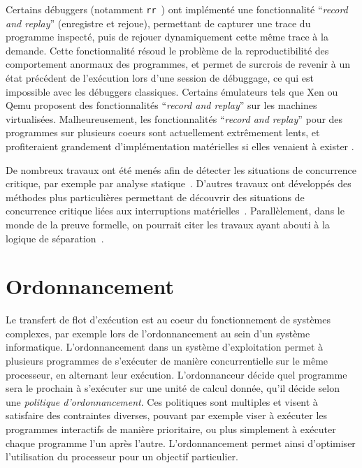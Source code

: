 Certains débuggers (notamment \texttt{rr}~\cite{mozRR}) ont implémenté une fonctionnalité ``\emph{record and replay}'' (enregistre et rejoue), permettant de capturer une trace du programme inspecté, puis de rejouer dynamiquement cette même trace à la demande. Cette fonctionnalité résoud le problème de la reproductibilité des comportement anormaux des programmes, et permet de surcrois de revenir à un état précédent de l'exécution lors d'une session de débuggage, ce qui est impossible avec les débuggers classiques. Certains émulateurs tels que Xen ou Qemu proposent des fonctionnalités ``\emph{record and replay}'' sur les machines virtualisées. Malheureusement, les fonctionnalités ``\emph{record and replay}'' pour des programmes sur plusieurs coeurs sont actuellement extrêmement lents, et profiteraient grandement d'implémentation matérielles si elles venaient à exister \cite{mozRR}.

De nombreux travaux ont été menés afin de détecter les situations de concurrence critique, par exemple par analyse statique~\cite{racerX}. D'autres travaux ont développés des méthodes plus particulières permettant de découvrir des situations de concurrence critique liées aux interruptions matérielles~\cite{sdracer}. Parallèlement, dans le monde de la preuve formelle, on pourrait citer les travaux ayant abouti à la logique de séparation~\cite{separationlogic}.


		\section{Ordonnancement}

		Le transfert de flot d'exécution est au coeur du fonctionnement de systèmes complexes, par exemple lors de l'ordonnancement au sein d'un système informatique. L'ordonnancement dans un système d'exploitation permet à plusieurs programmes de s'exécuter de manière concurrentielle sur le même processeur, en alternant leur exécution. L'ordonnanceur décide quel programme sera le prochain à s'exécuter sur une unité de calcul donnée, qu'il décide selon une \emph{politique d'ordonnancement}. Ces politiques sont multiples et visent à satisfaire des contraintes diverses, pouvant par exemple viser à exécuter les programmes interactifs de manière prioritaire, ou plus simplement à exécuter chaque programme l'un après l'autre. L'ordonnancement permet ainsi d'optimiser l'utilisation du processeur pour un objectif particulier. 


